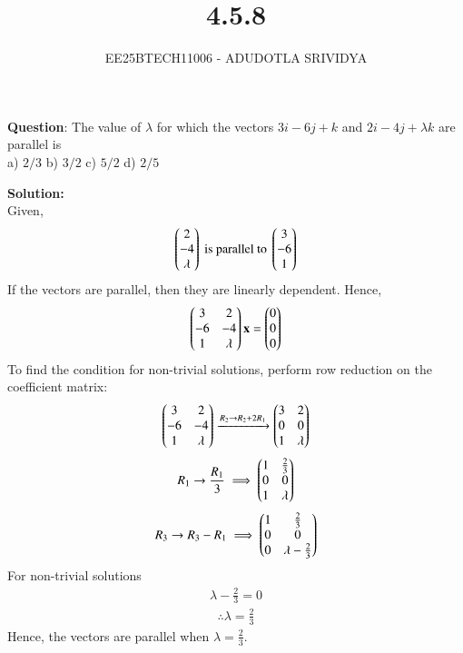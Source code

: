\documentclass[journal]{IEEEtran}
\begin{document}

\vspace{3cm}

\title{4.5.8}
\author{EE25BTECH11006 - ADUDOTLA SRIVIDYA}
{\let\newpage\relax\maketitle}

\renewcommand{\thefigure}{\theenumi}
\renewcommand{\thetable}{\theenumi}
\setlength{\intextsep}{10pt}

\textbf{Question}: The value of $\lambda$ for which the vectors $3i-6j+k$ and $2i-4j+\lambda k$ are parallel is\\
a) $2/3$ \quad
b) $3/2$ \quad
c) $5/2$ \quad
d) $2/5$ \quad

\textbf{Solution:}\\
Given,
\begin{align}
    \begin{pmatrix}2\\-4\\ \lambda \end{pmatrix} \text{ is parallel to }  \begin{pmatrix}3\\-6\\1\end{pmatrix}
\end{align}
If the vectors are parallel, then they are linearly dependent. Hence,
\begin{align}
    \begin{pmatrix}3 & 2 \\ -6 & -4 \\ 1 & \lambda\end{pmatrix}\mathbf{x} = \begin{pmatrix}0 \\ 0 \\ 0\end{pmatrix}
\end{align}
To find the condition for non-trivial solutions, perform row reduction on the coefficient matrix:
\begin{align}
\begin{pmatrix}3 & 2 \\-6 & -4 \\1 & \lambda\end{pmatrix}
\xrightarrow{R_2 \rightarrow R_2 + 2R_1}
\begin{pmatrix}3 & 2 \\0 & 0 \\1 & \lambda\end{pmatrix}
\end{align}
\begin{align}
R_1 \rightarrow \frac{R_1}{3} \implies
\begin{pmatrix}1 & \frac{2}{3} \\0 & 0 \\1 & \lambda\end{pmatrix}
\end{align}
\begin{align}
R_3 \rightarrow R_3 - R_1 \implies
\begin{pmatrix}1 & \frac{2}{3} \\0 & 0 \\0 & \lambda - \frac{2}{3}\end{pmatrix}
\end{align}
For non-trivial solutions
\begin{align}
    \lambda - \frac{2}{3} = 0
\end{align}
\begin{align}
    \therefore \lambda = \frac{2}{3}
\end{align}
Hence, the vectors are parallel when $\lambda = \frac{2}{3}$.
\end{document}
